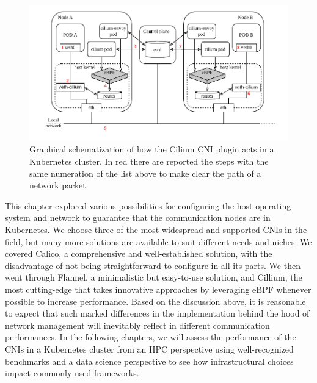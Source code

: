 \begin{figure}
  \centering
  \includegraphics[width=\textwidth]{img/chpt2/CNI-cilium}
  \caption{Graphical schematization of how the Cilium CNI plugin acts in a
    Kubernetes cluster. In red there are reported the steps with the same
    numeration of the list above to make clear the path of a network packet.}
  \label{fig:cni-cilium}
\end{figure}

This chapter explored various possibilities for configuring the host operating
system and network to guarantee that the communication nodes are in Kubernetes.
We choose three of the most widespread and supported CNIs in the field, but many
more solutions are available to suit different needs and niches. We covered
Calico, a comprehensive and well-established solution, with the disadvantage of
not being straightforward to configure in all its parts. We then went through
Flannel, a minimalistic but easy-to-use solution, and Cillium, the most
cutting-edge that takes innovative approaches by leveraging eBPF whenever
possible to increase performance.
Based on the discussion above, it is reasonable to expect that such marked
differences in the implementation behind the hood of network management will
inevitably reflect in different communication performances.
In the following chapters, we will assess the performance of the CNIs in a
Kubernetes cluster from an HPC perspective using well-recognized benchmarks and
a data science perspective to see how infrastructural choices impact commonly
used frameworks.
